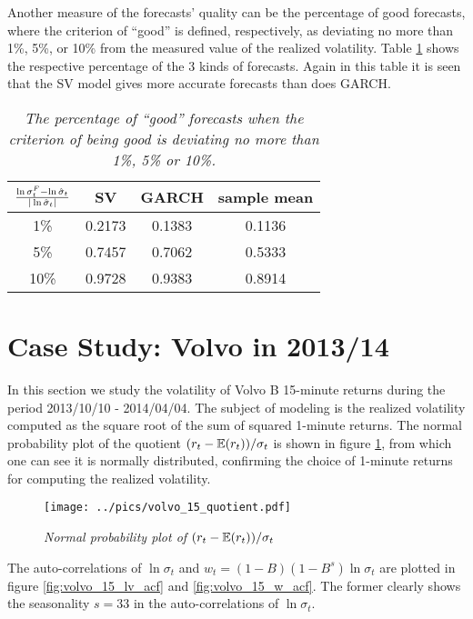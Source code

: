 Another measure of the forecasts' quality can be the percentage of good
forecasts, where the criterion of ``good'' is defined, respectively,
as deviating no more than 1\%, 5\%, or 10\% from the measured value of
the realized volatility. Table \ref{tab:nordea_2012_good} shows the
respective percentage of the 3 kinds of forecasts. Again in this table
it is seen that the SV model gives more accurate forecasts than does
GARCH.
\begin{table}[htb!]
  \centering
  \begin{tabular}{|c|c|c|c|}
    \hline
    ${\ln \sigma^F_t - \ln \hat{\sigma}_t \over |\ln \hat{\sigma}_t|}$
    & SV & GARCH & sample mean \\
    \hline
    1\% & 0.2173 & 0.1383 & 0.1136 \\
    \hline
    5\% & 0.7457 & 0.7062 & 0.5333 \\
    \hline
    10\% & 0.9728 & 0.9383 & 0.8914 \\
    \hline
  \end{tabular}
  \caption{\small \it The percentage of ``good'' forecasts when the
    criterion of being good is deviating no more than 1\%, 5\% or
    10\%.}
  \label{tab:nordea_2012_good}
\end{table}

\section{Case Study: Volvo in 2013/14}
\label{sec:volvo}
In this section we study the volatility of Volvo B 15-minute returns
during the period 2013/10/10 - 2014/04/04.
The subject of modeling is the realized volatility
computed as the square root of the sum of squared 1-minute
returns. The normal probability plot of the quotient $(r_t -
\mathbb{E}(r_t))/\sigma_t$ is shown in figure \ref{fig:volvo_15_quotient},
from which one can see it is normally distributed, confirming the
choice of 1-minute returns for computing the realized volatility.
\begin{figure}[htb!]
  \centering
  \texttt{[image: ../pics/volvo\_15\_quotient.pdf]}
  \caption{\small \it Normal probability plot of $(r_t -
    \mathbb{E}(r_t))/\sigma_t$}
  \label{fig:volvo_15_quotient}
\end{figure}
The auto-correlations of $\ln \sigma_t$ and $w_t = (1-B)(1-B^s) \ln
\sigma_t$ are plotted in figure \ref{fig:volvo_15_lv_acf} and
\ref{fig:volvo_15_w_acf}. The former clearly shows the seasonality
$s = 33$ in the auto-correlations of $\ln \sigma_t$.

